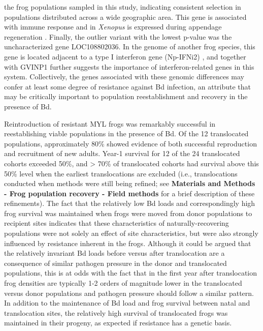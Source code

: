 \documentclass[9pt,twocolumn,twoside,lineno]{pnas-new}
\begin{document}
the frog populations sampled in this study, indicating consistent
selection in populations distributed across a wide geographic area. This
gene is associated with immune response and in \emph{Xenopus} is
expressed during appendage regeneration \citep{fukazawa2009}. Finally,
the outlier variant with the lowest p-value was the uncharacterized gene
LOC108802036. In the genome of another frog species, this gene is
located adjacent to a type I interferon gene (Np-IFNi2) \citep{gan2018},
and together with GVINP1 further suggests the importance of
interferon-related genes in this system. Collectively, the genes
associated with these genomic differences may confer at least some
degree of resistance against Bd infection, an attribute that may be
critically important to population reestablishment and recovery in the
presence of Bd.

Reintroduction of resistant MYL frogs was remarkably successful in
reestablishing viable populations in the presence of Bd. Of the 12
translocated populations, approximately 80\% showed evidence of both
successful reproduction and recruitment of new adults. Year-1 survival
for 12 of the 24 translocated cohorts exceeded 50\%, and \textgreater{}
70\% of translocated cohorts had survival above this 50\% level when the
earliest translocations are excluded (i.e., translocations conducted
when methods were still being refined; see \textbf{Materials and Methods
- Frog population recovery - Field methods} for a brief description of
these refinements). The fact that the relatively low Bd loads and
correspondingly high frog survival was maintained when frogs were moved
from donor populations to recipient sites indicates that these
characteristics of naturally-recovering populations were not solely an
effect of site characteristics, but were also strongly influenced by
resistance inherent in the frogs. Although it could be argued that the
relatively invariant Bd loads before versus after translocation are a
consequence of similar pathogen pressure in the donor and translocated
populations, this is at odds with the fact that in the first year after
translocation frog densities are typically 1-2 orders of magnitude lower
in the translocated versus donor populations and pathogen pressure
should follow a similar pattern. In addition to the maintenance of Bd
load and frog survival between natal and translocation sites, the
relatively high survival of translocated frogs was maintained in their
progeny, as expected if resistance has a genetic basis.
\end{document}
